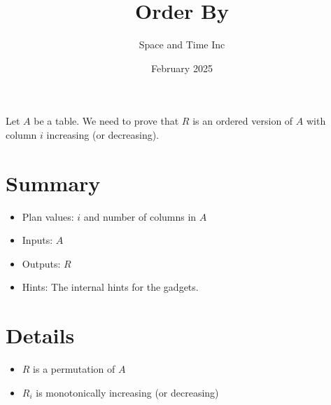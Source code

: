 \documentclass[11pt]{article}
\title{Order By}
\author{Space and Time Inc}
\date{February 2025}
\begin{document}
\maketitle

\noindent Let $A$ be a table. We need to prove that $R$ is an ordered version of $A$ with column $i$ increasing (or decreasing). \\

\section{Summary}
\begin{itemize}
    \item Plan values: $i$ and number of columns in $A$
    \item Inputs: $A$
    \item Outputs: $R$
    \item Hints: The internal hints for the gadgets.
\end{itemize}

\section{Details}
\begin{itemize}
    \item $R$ is a permutation of $A$
    \item $R_i$ is monotonically increasing (or decreasing)
\end{itemize}
\end{document}
